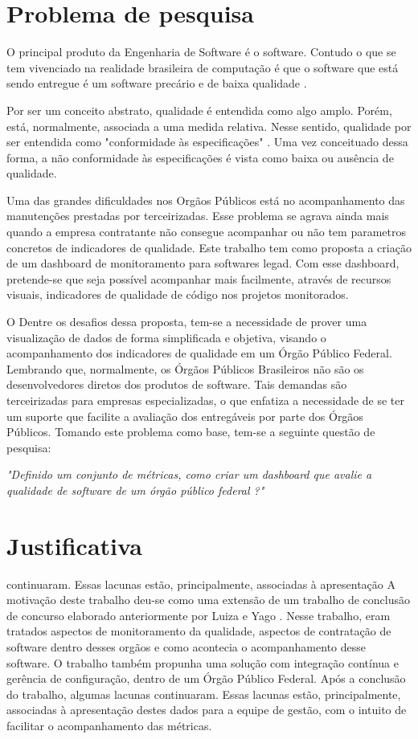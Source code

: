 \section{Problema de pesquisa}
O principal produto da Engenharia de Software é o software. Contudo o que se tem vivenciado na realidade brasileira de computação é que o software que está sendo entregue é um software precário e de baixa qualidade \cite{schnaider_uma_2004}.

 Por ser um conceito abstrato, qualidade é entendida como algo amplo. Porém, está, normalmente, associada a uma medida relativa. Nesse sentido, qualidade por ser entendida como "conformidade às especificações" \cite{crosby}. Uma vez conceituado dessa forma, a não conformidade às especificações é vista como baixa ou ausência de qualidade.

 Uma das grandes dificuldades nos Orgãos Públicos está no acompanhamento das manutenções prestadas por terceirizadas. Esse problema se agrava ainda mais quando a empresa contratante não consegue acompanhar ou não tem parametros concretos de indicadores de qualidade. 
Este trabalho tem como proposta a criação de um dashboard de monitoramento para softwares legad. Com esse dashboard, pretende-se que seja possível acompanhar mais facilmente, através de recursos visuais, indicadores de qualidade de código nos projetos monitorados.

O Dentre os desafios dessa proposta, tem-se a necessidade de prover uma visualização de dados de forma simplificada e objetiva, visando o acompanhamento dos indicadores de qualidade em um Órgão Público Federal.  Lembrando que, normalmente, os Órgãos Públicos Brasileiros não são os desenvolvedores diretos dos produtos de software. Tais demandas são terceirizadas para empresas especializadas, o que enfatiza a necessidade de se ter um suporte que facilite a avaliação dos entregáveis por parte dos Órgãos Públicos. Tomando este problema como base, tem-se a seguinte questão de pesquisa:
	
	\begin{center}
	\textit{"Definido um conjunto de métricas, como criar um dashboard que avalie a qualidade de software de um órgão público federal ?"}	
	\end{center}

\section{Justificativa}
continuaram. Essas lacunas estão, principalmente, associadas à apresentação
	A motivação deste trabalho deu-se como uma extensão de um trabalho de conclusão de concurso elaborado anteriormente por Luiza e Yago \cite{luiza_yago}. Nesse trabalho, eram tratados aspectos de monitoramento da qualidade, aspectos de contratação de software dentro desses orgãos e como acontecia o acompanhamento desse software. O trabalho também propunha uma solução com integração contínua e gerência de configuração, dentro de um Órgão Público Federal. Após a conclusão do trabalho, algumas lacunas continuaram. Essas lacunas estão, principalmente, associadas à apresentação destes dados para a equipe de gestão, com o intuito de facilitar o acompanhamento das métricas.

